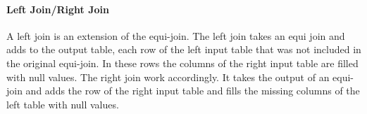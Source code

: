 \paragraph{Left Join/Right Join}
A left join is an extension of the equi-join. The left join takes an equi join and adds to the output table, each row of the left input table that was not included in the original equi-join. In these rows the columns of the right input table are filled with null values.
The right join work accordingly. It takes the output of an equi-join and adds the row of the right input table and fills the missing columns of the left table with null values.


